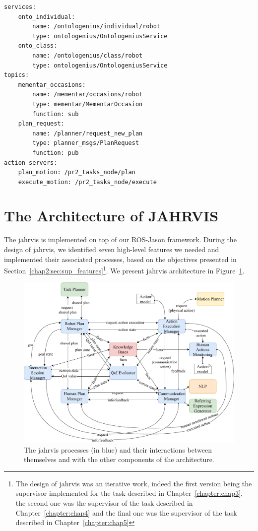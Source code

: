 \documentclass[a4paper,11pt,twoside]{StyleThese}
\begin{document}
\begin{lstlisting}[caption={Example of service, topic and action server definitions in a YAML file.}, label={chap2:lst:ros-jason}]
services:
	onto_individual: 
		name: /ontologenius/individual/robot
		type: ontologenius/OntologeniusService
	onto_class: 
		name: /ontologenius/class/robot
		type: ontologenius/OntologeniusService
topics:
	mementar_occasions: 
		name: /mementar/occasions/robot
		type: mementar/MementarOccasion
		function: sub
	plan_request:
		name: /planner/request_new_plan
		type: planner_msgs/PlanRequest
		function: pub
action_servers:
	plan_motion: /pr2_tasks_node/plan
	execute_motion: /pr2_tasks_node/execute
\end{lstlisting}


\section{The Architecture of JAHRVIS}
The \acrfull{jahrvis} is implemented on top of our ROS-Jason framework. During the design of \acrshort{jahrvis}, we identified seven high-level features we needed and implemented their associated processes, based on the objectives presented in Section~\ref{chap2:sec:sup_features}\footnote{The design of \acrshort{jahrvis} was an iterative work, indeed the first version being the supervisor implemented for the task described in Chapter~\ref{chapter:chap3}, the second one was the supervisor of the task described in Chapter~\ref{chapter:chap4} and the final one was the supervisor of the task described in Chapter~\ref{chapter:chap5}}. We present \acrshort{jahrvis} architecture in Figure~\ref{chap2:fig:sup_overview}. 

\begin{figure}[!ht]
	\includegraphics[width=\linewidth]{figures/chapter2/supervisor_modules.pdf}
	\caption{The \acrshort{jahrvis} processes (in blue) and their interactions between themselves and with the other components of the architecture.}
	\label{chap2:fig:sup_overview}
\end{figure}
\end{document}
